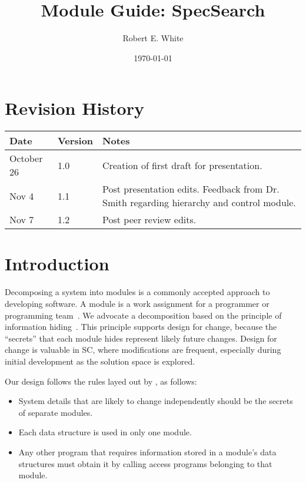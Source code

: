 \documentclass[12pt, titlepage]{article}
\begin{document}
\title{Module Guide: SpecSearch} 
\author{Robert E. White}
\date{\today}

\maketitle
\section{Revision History}

\begin{tabularx}{\textwidth}{p{3cm}p{2cm}X}
\toprule {\bf Date} & {\bf Version} & {\bf Notes}\\
\midrule
October 26 & 1.0 & Creation of first draft for presentation.\\ 
Nov 4 & 1.1 & Post presentation edits. Feedback from Dr. Smith regarding 
hierarchy and control module.\\
Nov 7 & 1.2 & Post peer review edits. \\
\bottomrule
\end{tabularx}

\newpage

\tableofcontents

\listoftables

\listoffigures

\newpage


\section{Introduction}

Decomposing a system into modules is a commonly accepted approach to developing
software.  A module is a work assignment for a programmer or programming
team~\citep{ParnasEtAl1984}.  We advocate a decomposition
based on the principle of information hiding~\citep{Parnas1972a}.  This
principle supports design for change, because the ``secrets'' that each module
hides represent likely future changes.  Design for change is valuable in SC,
where modifications are frequent, especially during initial development as the
solution space is explored.  

Our design follows the rules layed out by \citet{ParnasEtAl1984}, as follows:
\begin{itemize}
\item System details that are likely to change independently should be the
  secrets of separate modules.
\item Each data structure is used in only one module.
\item Any other program that requires information stored in a module's data
  structures must obtain it by calling access programs belonging to that module.
\end{itemize}
\end{document}
